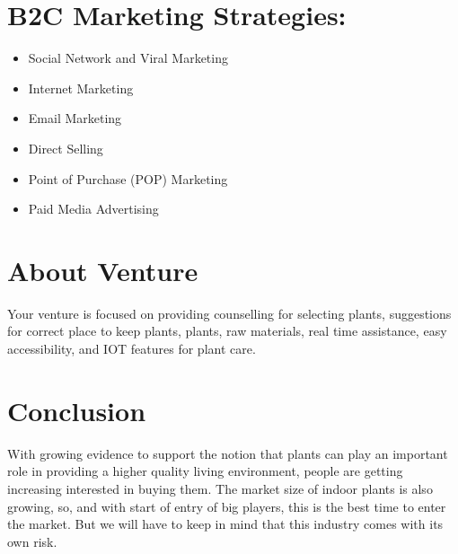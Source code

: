 \documentclass{article}
\begin{document}
\section{B2C Marketing Strategies:}
\begin{itemize}
    \item Social Network and Viral Marketing
    \item Internet Marketing
    \item Email Marketing
    \item Direct Selling
    \item Point of Purchase (POP) Marketing
    \item Paid Media Advertising
\end{itemize}

 
\section{About Venture}

Your venture is focused on providing counselling for selecting plants, suggestions for correct place to keep plants, plants, raw materials, real time assistance, easy accessibility, and IOT features for plant care. 


\section{Conclusion}

With growing evidence to support the notion that plants can play an important role in providing a higher quality living environment, people are getting increasing interested in buying them. The market size of indoor plants is also growing, so, and with start of entry of big players, this is the best time to enter the market. But we will have to keep in mind that this industry comes with its own risk.
\end{document}
